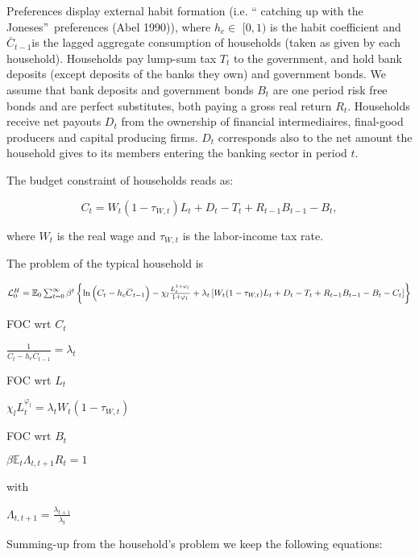 \documentclass{article}
\begin{document}
Preferences display external habit formation (i.e. \textquotedblleft
catching up with the Joneses\textquotedblright\ preferences (Abel 1990)),
where $h_{c}\in $ $[0,1)$ is the habit coefficient and $\overset{\_}{C}%
_{t-1} $is the lagged aggregate consumption of households (taken as given by
each household). Households pay lump-sum tax $T_{t}$ to the government, and
hold bank deposits (except deposits of the banks they own) and government
bonds. We assume that bank deposits and government bonds $B_{t}$ are one
period risk free bonds and are perfect substitutes, both paying a gross real
return $R_{t}$. Households receive net payouts $D_{t}$ from the ownership of
financial intermediaires, final-good producers and capital producing firms. $%
D_{t}$ corresponds also to the net amount the household gives to its members
entering the banking sector in period $t$.

The budget constraint of households reads as:

\begin{equation}
C_{t}=W_{t}(1-\tau _{W,t})L_{t}+D_{t}-T_{t}+R_{t-1}B_{t-1}-B_{t},
\label{h_budget}
\end{equation}

where $W_{t}$ is the real wage and $\tau _{W,t}$ is the labor-income tax
rate.

The problem of the typical household is

$\mathcal{L}_{0}^{H}=\mathbb{E}_{0}\sum_{t=0}^{\infty }\beta ^{t}\left\{ \ln
\left( C_{t}-h_{c}\overset{\_}{C}_{t-1}\right) -\chi _{l}\frac{%
L_{t}^{1+\varphi _{l}}}{1+\varphi _{l}}+\lambda _{t}\left[ W_{t}(1-\tau
_{W,t})L_{t}+D_{t}-T_{t}+R_{t-1}B_{t-1}-B_{t}-C_{t}\right] \right\} $

FOC wrt $C_{t}$

$\frac{1}{C_{t}-h_{c}\overset{\_}{C}_{t-1}}=\lambda _{t}$

FOC wrt $L_{t}$

$\chi _{l}L_{t}^{\varphi _{l}}=\lambda _{t}W_{t}(1-\tau _{W,t})$

FOC wrt $B_{t}$

$\beta \mathbb{E}_{t}\Lambda _{t,t+1}R_{t}=1$

with

$\Lambda _{t,t+1}=\frac{\lambda _{t+1}}{\lambda _{t}}$

Summing-up from the household's problem we keep the following equations:
\end{document}
